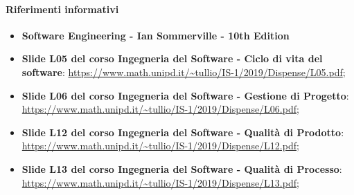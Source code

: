 \paragraph{Riferimenti informativi}
\begin{itemize}
	\item \textbf{Software Engineering - Ian Sommerville - 10th Edition}
	\item \textbf{Slide L05 del corso Ingegneria del Software - Ciclo di vita del software}: 
	\url{https://www.math.unipd.it/~tullio/IS-1/2019/Dispense/L05.pdf};
	\item \textbf{Slide L06 del corso Ingegneria del Software - Gestione di Progetto}: 
	\url{https://www.math.unipd.it/~tullio/IS-1/2019/Dispense/L06.pdf};	
	\item \textbf{Slide L12 del corso Ingegneria del Software - Qualità di Prodotto}: 
	\url{https://www.math.unipd.it/~tullio/IS-1/2019/Dispense/L12.pdf};
	\item \textbf{Slide L13 del corso Ingegneria del Software - Qualità di Processo}: 
	\url{https://www.math.unipd.it/~tullio/IS-1/2019/Dispense/L13.pdf};
\end{itemize}